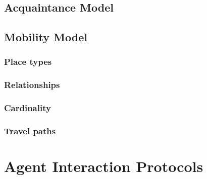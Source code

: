 \documentclass[a4paper,11pt]{report}
\begin{document}
  
  
  \subsection{Acquaintance Model}
  
  
  
  
  \subsection{Mobility Model}
  

  \subsubsection{Place types}
  
  \subsubsection{Relationships}
  
  \subsubsection{Cardinality}
  
  \subsubsection{Travel paths}
  
  
  
  
  \section{Agent Interaction Protocols} %
  
\end{document}
